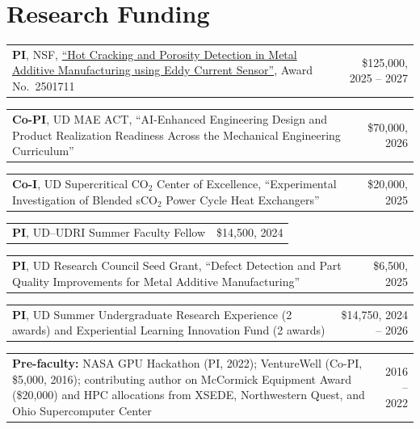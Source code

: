 \documentclass[10pt, letterpaper]{article}
\makeatletter
\newcommand{\cvitem}[2]{%
    \par\noindent
    \begin{tabularx}{\linewidth}[t]{@{}X@{\hspace{8 pt}}r@{}}
        #1 & \small\color{darkgray}#2
    \end{tabularx}\par
}
\newcommand{\amount}[1]{\textcolor{FlyersRed}{\$#1}}
\makeatother
\begin{document}
\section{Research Funding}
    \cvitem{\textbf{PI}, NSF, \href{https://www.nsf.gov/awardsearch/show-award?AWD_ID=2501711}{``Hot Cracking and Porosity Detection in Metal Additive Manufacturing using Eddy Current Sensor''}, Award No.\ 2501711}{\amount{125,000}, 2025 -- 2027}
    \cvitem{\textbf{Co-PI}, UD MAE ACT, ``AI-Enhanced Engineering Design and Product Realization Readiness Across the Mechanical Engineering Curriculum''}{\amount{70,000}, 2026}
    \cvitem{\textbf{Co-I}, UD Supercritical CO$_2$ Center of Excellence, ``Experimental Investigation of Blended sCO$_2$ Power Cycle Heat Exchangers''}{\amount{20,000}, 2025}
    \cvitem{\textbf{PI}, UD--UDRI Summer Faculty Fellow}{\amount{14,500}, 2024}
    \cvitem{\textbf{PI}, UD Research Council Seed Grant, ``Defect Detection and Part Quality Improvements for Metal Additive Manufacturing''}{\amount{6,500}, 2025}
    \cvitem{\textbf{PI}, UD Summer Undergraduate Research Experience (2 awards) and Experiential Learning Innovation Fund (2 awards)}{\amount{14,750}, 2024 -- 2026}
    \cvitem{\textbf{Pre-faculty:} NASA GPU Hackathon (PI, 2022); VentureWell (Co-PI, \amount{5,000}, 2016); contributing author on McCormick Equipment Award (\amount{20,000}) and HPC allocations from XSEDE, Northwestern Quest, and Ohio Supercomputer Center}{2016 -- 2022}
\end{document}
